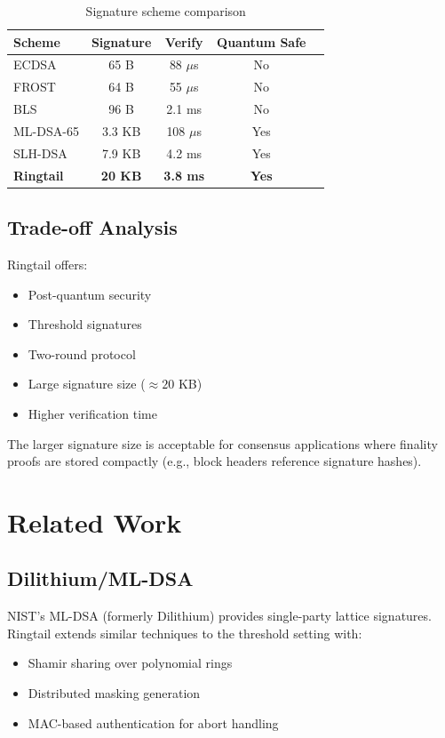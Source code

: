 \documentclass[11pt,a4paper]{article}
\theoremstyle{definition}
\begin{document}
\begin{table}[h]
\centering
\begin{tabular}{lcccc}
\toprule
Scheme & Signature & Verify & Quantum Safe \\
\midrule
ECDSA & 65 B & 88 $\mu$s & No \\
FROST & 64 B & 55 $\mu$s & No \\
BLS & 96 B & 2.1 ms & No \\
ML-DSA-65 & 3.3 KB & 108 $\mu$s & Yes \\
SLH-DSA & 7.9 KB & 4.2 ms & Yes \\
\textbf{Ringtail} & \textbf{20 KB} & \textbf{3.8 ms} & \textbf{Yes} \\
\bottomrule
\end{tabular}
\caption{Signature scheme comparison}
\end{table}

\subsection{Trade-off Analysis}

Ringtail offers:
\begin{itemize}
\item[$+$] Post-quantum security
\item[$+$] Threshold signatures
\item[$+$] Two-round protocol
\item[$-$] Large signature size ($\approx 20$ KB)
\item[$-$] Higher verification time
\end{itemize}

The larger signature size is acceptable for consensus applications where finality proofs are stored compactly (e.g., block headers reference signature hashes).

\section{Related Work}

\subsection{Dilithium/ML-DSA}

NIST's ML-DSA (formerly Dilithium) provides single-party lattice signatures. Ringtail extends similar techniques to the threshold setting with:
\begin{itemize}
\item Shamir sharing over polynomial rings
\item Distributed masking generation
\item MAC-based authentication for abort handling
\end{itemize}
\end{document}
